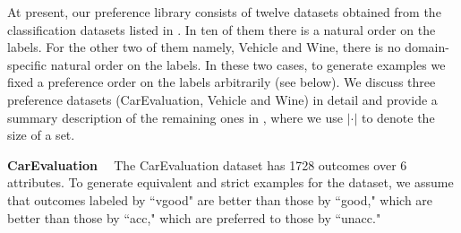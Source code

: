 At present, our preference library consists of twelve datasets obtained 
from the classification datasets listed in . 
In ten of them %
there is a natural order on the labels. 
For the other two of them namely, Vehicle and Wine, 
there is no domain-specific natural order on the labels. In these two cases, 
to generate examples we fixed a preference order on the labels arbitrarily 
(see below).
We discuss three preference datasets (CarEvaluation, Vehicle and Wine) 
in detail and provide a summary description
of the remaining ones in , where
we use $|\cdot|$ to denote the size of a set.


\smallskip \noindent \textbf{CarEvaluation \ }
The CarEvaluation dataset has 1728 outcomes over 6 attributes.
To generate equivalent and strict examples for the dataset,
we assume that outcomes labeled by ``vgood" are better than
those by ``good," which are better than those
by ``acc," which are preferred to those by ``unacc."

